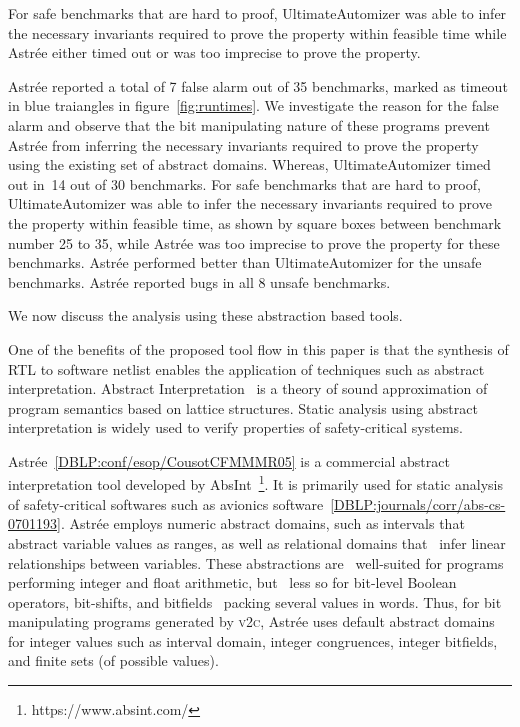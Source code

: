 For safe benchmarks that are hard to proof, UltimateAutomizer was able to infer 
the necessary invariants required to prove the property within feasible time 
while Astr{\'e}e either timed out or was too imprecise to prove the property. 

Astr{\'e}e reported a total of 7 false alarm out of 35 benchmarks, marked 
as timeout in blue traiangles in figure~\ref{fig:runtimes}.  
We investigate the reason for the false alarm and observe 
that the bit manipulating nature of these programs prevent Astr{\'e}e from 
inferring the necessary invariants required to prove the property using the 
existing set of abstract domains.  Whereas, UltimateAutomizer timed out in~14 
out of 30 benchmarks. For safe benchmarks that are hard to proof, UltimateAutomizer 
was able to infer the necessary invariants required to prove the property within 
feasible time, as shown by square boxes between benchmark number 25 to 35, while 
Astr{\'e}e was too imprecise to prove the property for these benchmarks. Astr{\'e}e 
performed better than UltimateAutomizer for the unsafe benchmarks.  Astr{\'e}e 
reported bugs in all 8 unsafe benchmarks. 


We now discuss the analysis using these abstraction based tools.

%
One of the benefits of the proposed tool flow in this paper is that the 
synthesis of RTL to software netlist enables the application of techniques 
such as abstract interpretation. Abstract Interpretation~\cite{Cousot92,CC79} is a theory of 
sound approximation of program semantics based on lattice structures. 
Static analysis using abstract interpretation is widely used to verify 
properties of safety-critical systems. 


Astr{\'e}e~\ref{DBLP:conf/esop/CousotCFMMMR05} is a commercial abstract 
interpretation tool developed by AbsInt~\footnote{https://www.absint.com/}.  
It is primarily used for static analysis of safety-critical softwares 
such as avionics software~\ref{DBLP:journals/corr/abs-cs-0701193}.
Astr{\'e}e employs numeric abstract domains, such as intervals that  
abstract variable values as ranges, as well as relational domains that  
infer linear relationships between variables. These abstractions are  
well-suited for programs performing integer and float arithmetic, but  
less so for bit-level Boolean operators, bit-shifts, and bitfields  
packing several values in words. Thus, for bit manipulating programs 
generated by \textsc{v2c}, Astr{\'e}e uses default abstract domains for 
integer values such as interval domain, integer congruences, integer 
bitfields, and finite sets (of possible values).


